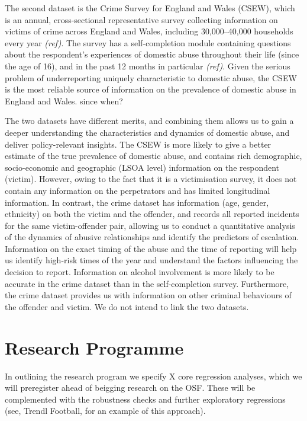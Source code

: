 \documentclass[11pt, a4paper]{article}
\begin{document}
The second dataset is the Crime Survey for England and Wales (CSEW), which is an annual, cross-sectional representative survey collecting information on victims of crime across England and Wales, including 30,000--40,000 households every year \textit{(ref)}. The survey has a self-completion module containing questions about the respondent's experiences of domestic abuse throughout their life (since the age of 16), and in the past 12 months in particular \textit{(ref)}. Given the serious problem of underreporting uniquely characteristic to domestic abuse, the CSEW is the most reliable source of information on the prevalence of domestic abuse in England and Wales.   since when?

The two datasets have different merits, and combining them allows us to gain a deeper understanding the characteristics and dynamics of domestic abuse, and deliver policy-relevant insights. The CSEW is more likely to give a better estimate of the true prevalence of domestic abuse, and contains rich demographic, socio-economic and geographic (LSOA level) information on the respondent (victim). However, owing to the fact that it is a victimisation survey, it does not contain any information on the perpetrators and has limited longitudinal information. In contrast, the crime dataset has information (age, gender, ethnicity) on both the victim and the offender, and records all reported incidents for the same victim-offender pair, allowing us to conduct a quantitative analysis of the dynamics of abusive relationships and identify the predictors of escalation. Information on the exact timing of the abuse and the time of reporting will help us identify high-risk times of the year and understand the factors influencing the decision to report. Information on alcohol involvement is more likely to be accurate in the crime dataset than in the self-completion survey. Furthermore, the crime dataset provides us with information on other criminal behaviours of the offender and victim.  We do not intend to link the two datasets.

\newpage

\section*{Research Programme}

In outlining the research program we specify X core regression analyses, which we will preregister ahead of beigging research on the OSF. These will be complemented with the robustness checks and further exploratory regressions (see, Trendl Football, for an example of this approach). 
\end{document}
